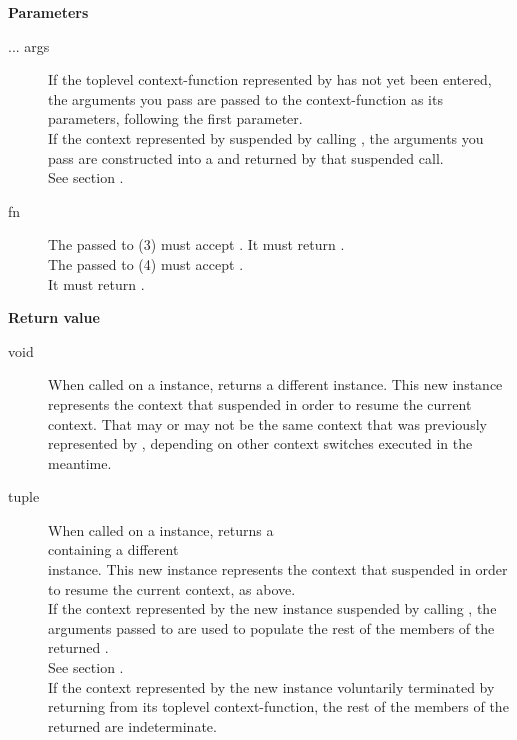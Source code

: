 {\bfseries Parameters}
\begin{description}
    \item[... args] If the toplevel context-function represented
                    by  has not yet been entered, the arguments
                    you pass are passed to the context-function as its
                    parameters, following the \ectx first parameter. \\
                    If the context represented by  suspended by
                    calling \op, the arguments you pass
                    are constructed into a \ectxargstup and returned by
                    that suspended \op call. \\
                    See section .\\
    \item[fn]       The  passed to (3) must accept \ectxargsargs. It
                    must return \ectxargstup.\\
                    The  passed to (4) must accept \ectxvoid.\\
                    It must return \ectxvoid.\\
\end{description}

{\bfseries Return value}
\begin{description}
    \item[void]     When called on a \ectxvoid instance, \op returns
                    a different \ectxvoid instance. This new instance
                    represents the context that suspended in order to resume
                    the current context. That may or may not be the same
                    context that was previously represented by ,
                    depending on other context switches executed in the
                    meantime.
    \item[tuple]    When called on a \ectxargs instance, \op returns a\\
                    \ectxargstup containing a different\\
                    \ectxargs instance. This new instance represents the
                    context that suspended in order to resume the current
                    context, as above.\\
                    If the context represented by the new \ectxargs instance
                    suspended by calling \op, the arguments passed to \op are
                    used to populate the rest of the members of the
                    returned .\\
                    See section .\\
                    If the context represented by the new \ectxargs instance
                    voluntarily terminated by returning from its toplevel
                    context-function, the rest of the members of the
                    returned  are indeterminate.\\
\end{description}

